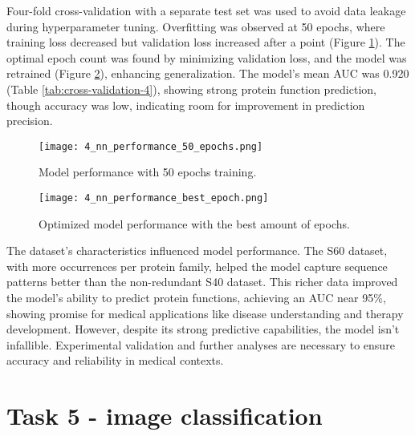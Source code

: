 \documentclass[a4paper,12pt]{article}
\begin{document}
Four-fold cross-validation with a separate test set was used to avoid data leakage during hyperparameter tuning. Overfitting was observed at 50 epochs, where training loss decreased but validation loss increased after a point (Figure \ref{fig:50-epochs-4}). The optimal epoch count was found by minimizing validation loss, and the model was retrained (Figure \ref{fig:best-epoch-4}), enhancing generalization. The model's mean AUC was 0.920 (Table \ref{tab:cross-validation-4}), showing strong protein function prediction, though accuracy was low, indicating room for improvement in prediction precision.




\begin{figure}[h]
  \centering
  \texttt{[image: 4\_nn\_performance\_50\_epochs.png]}
  \caption{Model performance with 50 epochs training.}
  \label{fig:50-epochs-4}
\end{figure}

\begin{figure}[h]
  \centering
  \texttt{[image: 4\_nn\_performance\_best\_epoch.png]}
  \caption{Optimized model performance with the best amount of epochs.}
  \label{fig:best-epoch-4}
\end{figure}




The dataset's characteristics influenced model performance. The S60 dataset, with more occurrences per protein family, helped the model capture sequence patterns better than the non-redundant S40 dataset. This richer data improved the model's ability to predict protein functions, achieving an AUC near 95\%, showing promise for medical applications like disease understanding and therapy development. However, despite its strong predictive capabilities, the model isn't infallible. Experimental validation and further analyses are necessary to ensure accuracy and reliability in medical contexts.







\pagebreak
\section{Task 5 - image classification}
\end{document}
